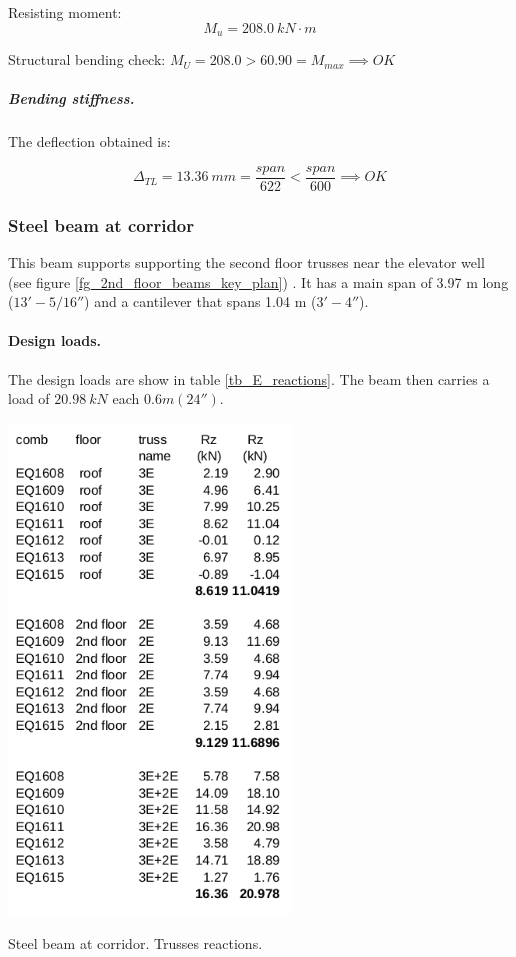 \noindent Resisting moment:
\begin{equation}
  M_u= 208.0\ kN\cdot m
\end{equation}

\noindent Structural bending check: $M_U = 208.0 > 60.90 = M_{max} \implies OK$

\subparagraph{Bending stiffness.}
The deflection obtained is:

\begin{equation}
  \Delta_{TL}= 13.36\ mm= \frac{span}{622} < \frac{span}{600} \implies OK
\end{equation}

\subsubsection{Steel beam at corridor}
This beam supports supporting the second floor trusses near the elevator well (see figure \ref{fg_2nd_floor_beams_key_plan}) . It has a main span of 3.97 m long ($13' - 5/16''$)  and a cantilever that spans 1.04 m ($3'-4''$).

\paragraph{Design loads.}
The design loads are show in table \ref{tb_E_reactions}. The beam then carries a load of $20.98\ kN$ each $0.6 m (24'')$. 

\begin{table}
  \begin{center}
  \includegraphics[width=75mm]{figures/E_reactions}
  \end{center}
  \caption{Steel beam at corridor. Trusses reactions.}\label{tb_E_reactions}
\end{table}

